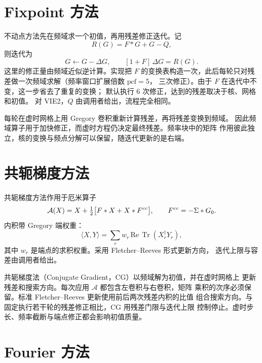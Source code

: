 \section{Fixpoint 方法}
\label{sec:fixpoint}

不动点方法先在频域求一个初值，再用残差修正迭代。记
\begin{equation}
    R(G) = F*G + G - Q,
\end{equation}
则迭代为
\begin{equation}
    G \leftarrow G - \Delta G,
    \qquad [1+F]\,\Delta G = R(G).
\end{equation}
这里的修正量由频域近似逆计算。实现把
$F$ 的变换表构造一次，此后每轮只对残差做一次频域求解（频率窗口扩展倍数
$\mathrm{pcf}=5$，
三次修正）。由于 $F$ 在迭代中不变，这一步省去了重复的变换；
默认执行 6 次修正，达到的残差取决于核、网格和初值。
对 VIE2，$Q$ 由调用者给出，流程完全相同。

每轮在虚时网格上用 Gregory 卷积重新计算残差，再将残差变换到频域。
因此频域算子用于加快修正，而虚时方程仍决定最终残差。频率块中的矩阵
作用彼此独立，核的变换与频点分解可以保留，随迭代更新的是右端。

\section{共轭梯度方法}
\label{sec:cg}

共轭梯度方法作用于厄米算子
\begin{equation}
    \mathcal{A}(X) = X + \tfrac{1}{2}\big[F*X + X*F^{cc}\big],
    \qquad F^{cc} = -\Sigma*G_0 .
    \label{eq:cg-operator}
\end{equation}
内积带 Gregory 端权重：
\begin{equation}
    \langle X,Y\rangle
    = \sum_{r} w_r\,\mathrm{Re}\,\operatorname{Tr}(X_r^\dagger Y_r),
\end{equation}
其中 $w_r$ 是端点的求积权重。采用 Fletcher--Reeves 形式更新方向，
迭代上限与容差由调用者给出。

共轭梯度法（Conjugate Gradient，CG）以频域解为初值，并在虚时网格上
更新残差和搜索方向。每次应用 $\mathcal A$ 都包含左卷积与右卷积，矩阵
乘积的次序必须保留。标准 Fletcher--Reeves 更新使用前后两次残差内积的比值
组合搜索方向。与固定执行若干轮的残差修正相比，CG 用残差门限与迭代上限
控制停止。虚时步长、频率截断与端点修正都会影响初值质量。

\section{Fourier 方法}
\label{sec:fourier-method}

